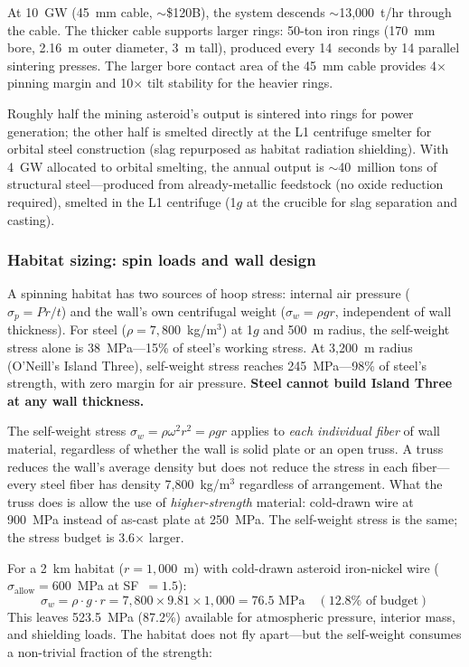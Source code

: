 \documentclass[12pt,letterpaper]{article}
\begin{document}
At 10~GW (45~mm cable, ${\sim}$\$120B), the system descends ${\sim}$13{,}000~t/hr through the cable. The thicker cable supports larger rings: 50-ton iron rings (170~mm bore, 2.16~m outer diameter, 3~m tall), produced every 14~seconds by 14 parallel sintering presses. The larger bore contact area of the 45~mm cable provides 4$\times$ pinning margin and 10$\times$ tilt stability for the heavier rings.

Roughly half the mining asteroid's output is sintered into rings for power generation; the other half is smelted directly at the L1 centrifuge smelter for orbital steel construction (slag repurposed as habitat radiation shielding). With 4~GW allocated to orbital smelting, the annual output is ${\sim}$40~million tons of structural steel---produced from already-metallic feedstock (no oxide reduction required), smelted in the L1 centrifuge (1$g$ at the crucible for slag separation and casting).

\subsubsection{Habitat sizing: spin loads and wall design}

A spinning habitat has two sources of hoop stress: internal air pressure ($\sigma_p = P r / t$) and the wall's own centrifugal weight ($\sigma_w = \rho g r$, independent of wall thickness). For steel ($\rho = 7{,}800$~kg/m$^3$) at 1$g$ and 500~m radius, the self-weight stress alone is 38~MPa---15\% of steel's working stress. At 3,200~m radius (O'Neill's Island Three), self-weight stress reaches 245~MPa---98\% of steel's strength, with zero margin for air pressure. \textbf{Steel cannot build Island Three at any wall thickness.}

The self-weight stress $\sigma_w = \rho \omega^2 r^2 = \rho g r$ applies to \emph{each individual fiber} of wall material, regardless of whether the wall is solid plate or an open truss. A truss reduces the wall's average density but does not reduce the stress in each fiber---every steel fiber has density 7,800~kg/m$^3$ regardless of arrangement. What the truss does is allow the use of \emph{higher-strength} material: cold-drawn wire at 900~MPa instead of as-cast plate at 250~MPa. The self-weight stress is the same; the stress budget is 3.6$\times$ larger.

For a 2~km habitat ($r = 1{,}000$~m) with cold-drawn asteroid iron-nickel wire ($\sigma_{\text{allow}} = 600$~MPa at SF~$= 1.5$):
\begin{equation}
\sigma_w = \rho \cdot g \cdot r = 7{,}800 \times 9.81 \times 1{,}000 = 76.5 \text{~MPa} \quad (12.8\% \text{ of budget})
\end{equation}
This leaves 523.5~MPa (87.2\%) available for atmospheric pressure, interior mass, and shielding loads. The habitat does not fly apart---but the self-weight consumes a non-trivial fraction of the strength:
\end{document}

